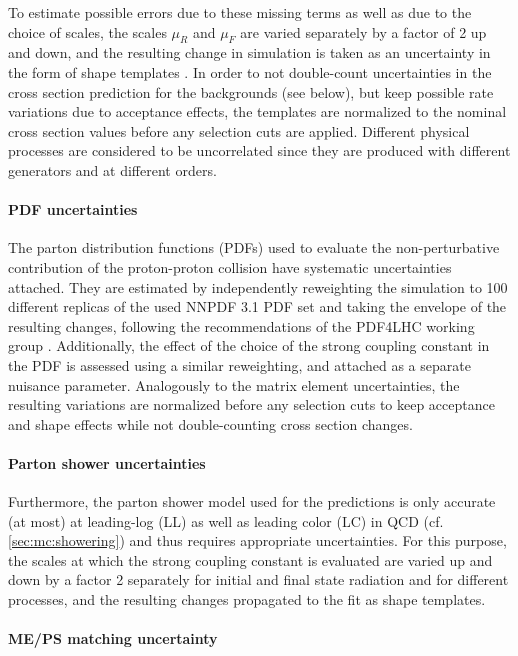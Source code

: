 To estimate possible errors due to these missing terms as well as due to the choice of scales, the scales $\mu_R$ and $\mu_F$ are varied separately by a factor of 2 up and down, and the resulting change in simulation is taken as an uncertainty in the form of shape templates \cite{Cacciari:2004}. In order to not double-count uncertainties in the cross section prediction for the backgrounds (see below), but keep possible rate variations due to acceptance effects, the templates are normalized to the nominal cross section values before any selection cuts are applied. Different physical processes are considered to be uncorrelated since they are produced with different generators and at different orders. 

\paragraph{PDF uncertainties}

The parton distribution functions (PDFs) used to evaluate the non-perturbative contribution of the proton-proton collision have systematic uncertainties attached. They are estimated by independently reweighting the simulation to 100 different replicas of the used NNPDF 3.1 PDF set and taking the envelope of the resulting changes, following the recommendations of the PDF4LHC working group \cite{Butterworth:2015oua}. Additionally, the effect of the choice of the strong coupling constant in the PDF is assessed using a similar reweighting, and attached as a separate nuisance parameter. Analogously to the matrix element uncertainties, the resulting variations are normalized before any selection cuts to keep acceptance and shape effects while not double-counting cross section changes.

\paragraph{Parton shower uncertainties}

Furthermore, the parton shower model used for the predictions is only accurate (at most) at leading-log (LL) as well as leading color (LC) in QCD (cf. \cref{sec:mc:showering}) and thus requires appropriate uncertainties. For this purpose, the scales at which the strong coupling constant is evaluated are varied up and down by a factor 2 separately for initial and final state radiation and for different processes, and the resulting changes propagated to the fit as shape templates.

\paragraph{ME/PS matching uncertainty}

